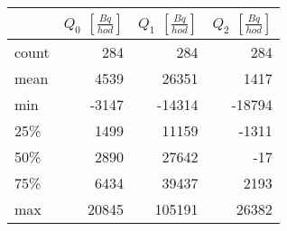 \begin{tabular}{lrrr}
\toprule
{} &  $Q_0$ $\left[\si{\frac{Bq}{hod}}\right]$ &  $Q_1$ $\left[\si{\frac{Bq}{hod}}\right]$ &  $Q_2$ $\left[\si{\frac{Bq}{hod}}\right]$ \\
\midrule
count &                                       284 &                                       284 &                                       284 \\
mean  &                                      4539 &                                     26351 &                                      1417 \\
min   &                                     -3147 &                                    -14314 &                                    -18794 \\
25\%   &                                      1499 &                                     11159 &                                     -1311 \\
50\%   &                                      2890 &                                     27642 &                                       -17 \\
75\%   &                                      6434 &                                     39437 &                                      2193 \\
max   &                                     20845 &                                    105191 &                                     26382 \\
\bottomrule
\end{tabular}
